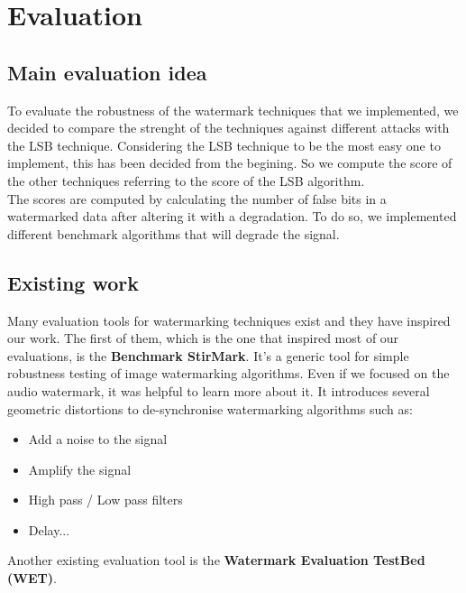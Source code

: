 \chapter{Evaluation}
\section{Main evaluation idea}

To evaluate the robustness of the watermark techniques that we implemented, we decided to compare the strenght of the techniques against different attacks with the LSB technique. Considering the LSB technique to be the most easy one to implement, this has been decided from the begining. So we compute the score of the other techniques referring to the score of the LSB algorithm. \\

The scores are computed by calculating the number of false bits in a watermarked data after altering it with a degradation. To do so, we implemented different benchmark algorithms that will degrade the signal. \\
\section{Existing work}

Many evaluation tools for watermarking techniques exist and they have inspired our work. 
The first of them, which is the one that inspired most of our evaluations, is the \textbf{Benchmark StirMark}. It's a generic tool for simple robustness testing of image watermarking algorithms. Even if we focused on the audio watermark, it was helpful to learn more about it. It introduces several geometric distortions to de-synchronise watermarking algorithms such as:
\begin{itemize}
 \item Add a noise to the signal
 \item Amplify  the signal
 \item High pass / Low pass filters
 \item Delay...
\end{itemize}

Another existing evaluation tool is the \textbf{Watermark Evaluation TestBed (WET)}.

